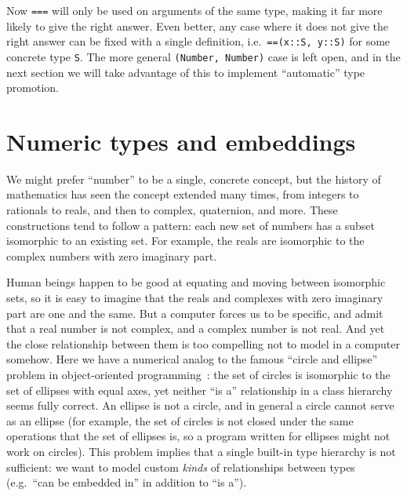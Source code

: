 \noindent
Now \texttt{===} will only be used on arguments of the same type,
making it far more likely to give the right answer.
Even better, any case where it does not give the right answer can be fixed with
a single definition, i.e.\ \texttt{==(x::S, y::S)} for some
concrete type \texttt{S}.
The more general \texttt{(Number, Number)} case is left open, and in the next
section we will take advantage of this to implement ``automatic'' type promotion.



\section{Numeric types and embeddings}
\label{sec:embeddings}

We might prefer ``number'' to be a single, concrete concept, but the history of
mathematics has seen the concept extended many times, from integers to rationals to
reals, and then to complex, quaternion, and more.
These constructions tend to follow a pattern: each new set of numbers has a subset
isomorphic to an existing set.
For example, the reals are isomorphic to the complex numbers with zero imaginary part.

Human beings happen to be good at equating and moving between isomorphic sets,
so it is easy to imagine that the reals and complexes with zero imaginary
part are one and the same.
But a computer forces us to be specific, and admit
that a real number is not complex, and a complex number is not real.
And yet the close relationship between them is too compelling not to model in a
computer somehow.
Here we have a numerical analog to the famous ``circle and ellipse'' problem in
object-oriented programming~\cite{cline1995c++}: the set of circles is
isomorphic to the set of ellipses with equal axes, yet neither ``is a''
relationship in a class hierarchy seems fully correct.
An ellipse is not a circle, and in general a circle cannot serve as an ellipse
(for example, the set of circles is not closed under the same operations that the
set of ellipses is, so a program written for ellipses might not work on circles).
This problem implies that a single built-in type hierarchy is not
sufficient: we want to model custom \emph{kinds} of relationships between
types (e.g.\ ``can be embedded in'' in addition to ``is a'').


